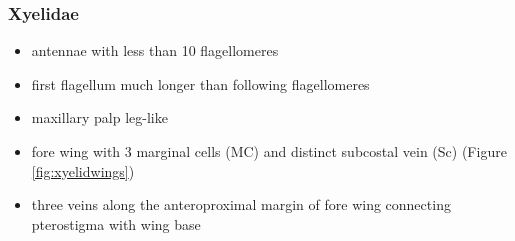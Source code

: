 \documentclass[letterpaper, 11pt]{article}
\begin{document}
\subsubsection{Xyelidae}
\begin{itemize}
\item antennae with less than 10 flagellomeres
\item first flagellum much longer than following flagellomeres  
\item maxillary palp leg-like
\item fore wing with 3 marginal cells (MC) and distinct subcostal vein (Sc) (Figure \ref{fig:xyelidwings})
\item three veins along the anteroproximal margin of fore wing connecting pterostigma with wing base
\end{itemize}
\end{document}
